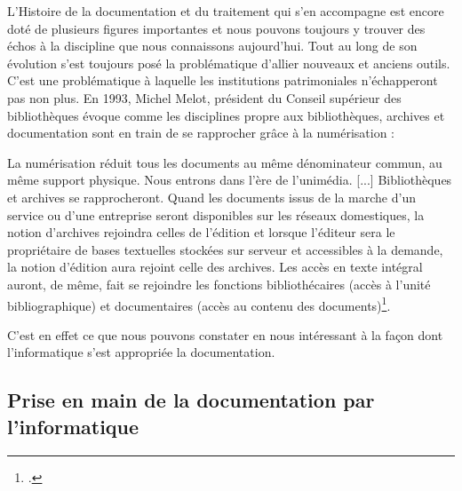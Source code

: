 
L’Histoire de la documentation et du traitement qui s’en accompagne est encore doté de plusieurs figures importantes et nous pouvons toujours y trouver des échos à la discipline que nous connaissons aujourd’hui. Tout au long de son évolution s’est toujours posé la problématique d’allier nouveaux et anciens outils. C’est une problématique à laquelle les institutions patrimoniales n’échapperont pas non plus. En 1993, Michel Melot, président du Conseil supérieur des bibliothèques évoque comme les disciplines propre aux bibliothèques, archives et documentation sont en train de se rapprocher grâce à la numérisation :
\begin{displayquote}
	La numérisation réduit tous les documents au même dénominateur commun, au même support physique. Nous entrons dans l'ère de l'unimédia. [...] 
	Bibliothèques et archives se rapprocheront. Quand les documents issus de la marche d'un service ou d'une entreprise seront disponibles sur les réseaux domestiques, la notion d'archives rejoindra celles de l'édition et lorsque l'éditeur sera le propriétaire de bases textuelles stockées sur serveur et accessibles à la demande, la notion d'édition aura rejoint celle des archives. Les accès en texte intégral auront, de même, fait se rejoindre les fonctions bibliothécaires (accès à l'unité bibliographique) et documentaires (accès au contenu des documents)\footcite[]{melot1993}.
\end{displayquote}
C'est en effet ce que nous pouvons constater en nous intéressant à la façon dont l'informatique s'est appropriée la documentation. 

\subsection{Prise en main de la documentation par l'informatique}

